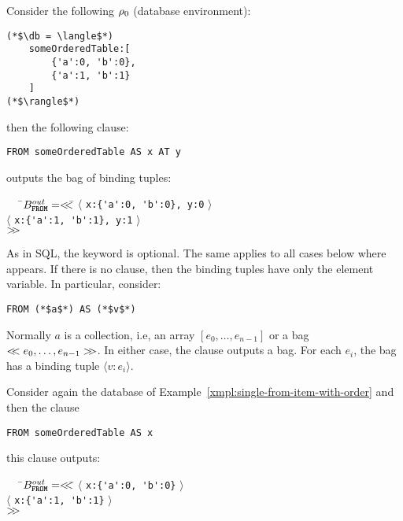 \begin{example}
\label{xmpl:single-from-item-with-order}

Consider the following $\rho_{0}$ (database environment):

\begin{lstlisting}
(*$\db = \langle$*)
    someOrderedTable:[
        {'a':0, 'b':0},
        {'a':1, 'b':1}
    ]
(*$\rangle$*)
\end{lstlisting}

\noindent then the following \from clause:

\begin{lstlisting}
FROM someOrderedTable AS x AT y
\end{lstlisting}

\noindent outputs the bag of binding tuples:

\begin{tabbing}
\ \ \ \=$B^{out}_{\texttt{\textbf{FROM}}} = <\!\!< $\=
    $\langle$ \lstinline|x:{'a':0, 'b':0}, y:0| $\rangle$\\
\>\>$\langle$ \lstinline|x:{'a':1, 'b':1}, y:1| $\rangle$\\
\>\>$>\!\!>$
\end{tabbing}
\end{example}

As in SQL, the keyword \as is optional. The same applies to all cases below
where \as appears. If there is no \at clause, then the binding tuples have only
the element variable. In particular, consider:

\begin{lstlisting}
FROM (*$a$*) AS (*$v$*)
\end{lstlisting}

\noindent Normally $a$ is a collection, i.e, an array
$[ e_0, \ldots, e_{n-1} ]$ or a bag $<\!\!< e_0, \ldots, e_{n-1} >\!\!>$.
In either case, the \from clause outputs a bag. For each $e_i$, the bag
has a binding tuple $\langle v:e_i \rangle$.

\begin{example}
Consider again the database of Example~\ref{xmpl:single-from-item-with-order}
and then the \from clause

\begin{lstlisting}
FROM someOrderedTable AS x
\end{lstlisting}

\noindent this \from clause outputs:

\begin{tabbing}
\ \ \ \=$B^{out}_{\texttt{\textbf{FROM}}} = <\!\!< $\=
    $\langle$ \lstinline|x:{'a':0, 'b':0}| $\rangle$\\
\>\>$\langle$ \lstinline|x:{'a':1, 'b':1}| $\rangle$\\
\>\>$>\!\!>$
\end{tabbing}
\end{example}

